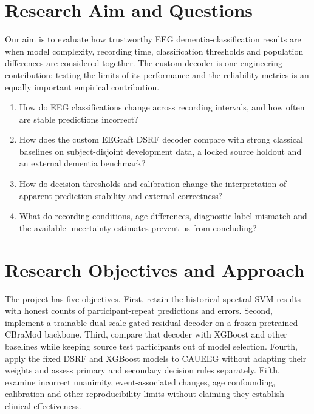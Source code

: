 \section{Research Aim and Questions}
Our aim is to evaluate how trustworthy EEG dementia-classification results are when model complexity, recording time, classification thresholds and population differences are considered together. The custom decoder is one engineering contribution; testing the limits of its performance and the reliability metrics is an equally important empirical contribution.

\begin{enumerate}[label=\textbf{RQ\arabic*:},leftmargin=2cm]
\item How do EEG classifications change across recording intervals, and how often are stable predictions incorrect?
\item How does the custom EEGraft DSRF decoder compare with strong classical baselines on subject-disjoint development data, a locked source holdout and an external dementia benchmark?
\item How do decision thresholds and calibration change the interpretation of apparent prediction stability and external correctness?
\item What do recording conditions, age differences, diagnostic-label mismatch and the available uncertainty estimates prevent us from concluding?
\end{enumerate}

\section{Research Objectives and Approach}
The project has five objectives. First, retain the historical spectral SVM results with honest counts of participant-repeat predictions and errors. Second, implement a trainable dual-scale gated residual decoder on a frozen pretrained CBraMod backbone. Third, compare that decoder with XGBoost and other baselines while keeping source test participants out of model selection. Fourth, apply the fixed DSRF and XGBoost models to CAUEEG without adapting their weights and assess primary and secondary decision rules separately. Fifth, examine incorrect unanimity, event-associated changes, age confounding, calibration and other reproducibility limits without claiming they establish clinical effectiveness.


